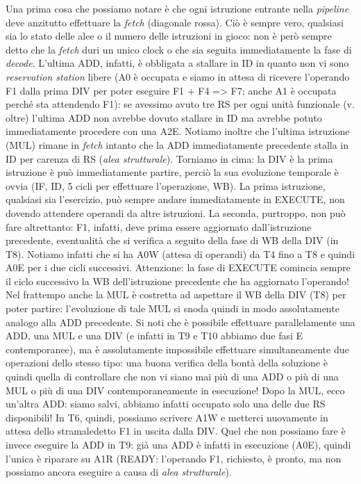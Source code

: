 Una prima cosa che possiamo notare è che ogni istruzione entrante nella \textit{pipeline} deve anzitutto effettuare la \textit{fetch} (diagonale rossa). Ciò è sempre vero, qualsiasi sia lo stato delle alee o il numero delle istruzioni in gioco: non è però sempre detto che la \textit{fetch} duri un unico clock o che sia seguita immediatamente la fase di \textit{decode}. L'ultima ADD, infatti, è obbligata a stallare in ID in quanto non vi sono \textit{reservation station} libere (A0 è occupata e siamo in attesa di ricevere l'operando F1 dalla prima DIV per poter eseguire F1 + F4 => F7; anche A1 è occupata perché sta attendendo F1): se avessimo avuto tre RS per ogni unità funzionale (v. oltre) l'ultima ADD non avrebbe dovuto stallare in ID ma avrebbe potuto immediatamente procedere con una A2E. Notiamo inoltre che l'ultima istruzione (MUL) rimane in \textit{fetch} intanto che la ADD immediatamente precedente stalla in ID per carenza di RS (\textit{alea strutturale}).
Torniamo in cima: la DIV è la prima istruzione è può immediatamente partire, perciò la sua evoluzione temporale è ovvia (IF, ID, 5 cicli per effettuare l'operazione, WB). La prima istruzione, qualsiasi sia l'esercizio, può sempre andare immediatamente in EXECUTE, non dovendo attendere operandi da altre istruzioni.
La seconda, purtroppo, non può fare altrettanto: F1, infatti, deve prima essere aggiornato dall'istruzione precedente, eventualità che si verifica a seguito della fase di WB della DIV (in T8). Notiamo infatti che si ha A0W (attesa di operandi) da T4 fino a T8 e quindi A0E per i due cicli successivi. Attenzione: la fase di EXECUTE comincia sempre il ciclo successivo la WB dell'istruzione precedente che ha aggiornato l'operando!
Nel frattempo anche la MUL è costretta ad aspettare il WB della DIV (T8) per poter partire: l'evoluzione di tale MUL si snoda quindi in modo assolutamente analogo alla ADD precedente. Si noti che è possibile effettuare parallelamente una ADD, una MUL e una DIV (e infatti in T9 e T10 abbiamo due fasi E contemporanee), ma è assolutamente impossibile effettuare simultaneamente due operazioni dello stesso tipo: una buona verifica della bontà della soluzione è quindi quella di controllare che non vi siano mai più di una ADD o più di una MUL o più di una DIV contemporaneamente in esecuzione!
Dopo la MUL, ecco un'altra ADD: siamo salvi, abbiamo infatti occupato solo una delle due RS disponibili! In T6, quindi, possiamo scrivere A1W e metterci nuovamente in attesa dello stramaledetto F1 in uscita dalla DIV. Quel che non possiamo fare è invece eseguire la ADD in T9: già una ADD è infatti in esecuzione (A0E), quindi l'unica è riparare su A1R (READY: l'operando F1, richiesto, è pronto, ma non possiamo ancora eseguire a causa di \textit{alea strutturale}).
